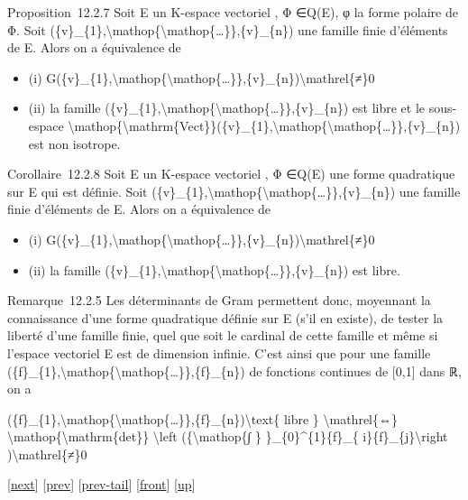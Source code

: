 \documentclass[]{article}
\begin{document}
Proposition~12.2.7 Soit E un K-espace vectoriel , Φ ∈Q(E), φ la forme
polaire de Φ. Soit
(\{v\}\_\{1\},\textbackslash{}mathop\{\textbackslash{}mathop\{\ldots{}\}\},\{v\}\_\{n\})
une famille finie d'éléments de E. Alors on a équivalence de

\begin{itemize}
\itemsep1pt\parskip0pt
\item
  (i)
  G(\{v\}\_\{1\},\textbackslash{}mathop\{\textbackslash{}mathop\{\ldots{}\}\},\{v\}\_\{n\})\textbackslash{}mathrel\{≠\}0
\item
  (ii) la famille
  (\{v\}\_\{1\},\textbackslash{}mathop\{\textbackslash{}mathop\{\ldots{}\}\},\{v\}\_\{n\})
  est libre et le sous-espace
  \textbackslash{}mathop\{\textbackslash{}mathrm\{Vect\}\}(\{v\}\_\{1\},\textbackslash{}mathop\{\textbackslash{}mathop\{\ldots{}\}\},\{v\}\_\{n\})
  est non isotrope.
\end{itemize}

Corollaire~12.2.8 Soit E un K-espace vectoriel , Φ ∈Q(E) une forme
quadratique sur E qui est définie. Soit
(\{v\}\_\{1\},\textbackslash{}mathop\{\textbackslash{}mathop\{\ldots{}\}\},\{v\}\_\{n\})
une famille finie d'éléments de E. Alors on a équivalence de

\begin{itemize}
\itemsep1pt\parskip0pt
\item
  (i)
  G(\{v\}\_\{1\},\textbackslash{}mathop\{\textbackslash{}mathop\{\ldots{}\}\},\{v\}\_\{n\})\textbackslash{}mathrel\{≠\}0
\item
  (ii) la famille
  (\{v\}\_\{1\},\textbackslash{}mathop\{\textbackslash{}mathop\{\ldots{}\}\},\{v\}\_\{n\})
  est libre.
\end{itemize}

Remarque~12.2.5 Les déterminants de Gram permettent donc, moyennant la
connaissance d'une forme quadratique définie sur E (s'il en existe), de
tester la liberté d'une famille finie, quel que soit le cardinal de
cette famille et même si l'espace vectoriel E est de dimension infinie.
C'est ainsi que pour une famille
(\{f\}\_\{1\},\textbackslash{}mathop\{\textbackslash{}mathop\{\ldots{}\}\},\{f\}\_\{n\})
de fonctions continues de {[}0,1{]} dans ℝ, on a

(\{f\}\_\{1\},\textbackslash{}mathop\{\textbackslash{}mathop\{\ldots{}\}\},\{f\}\_\{n\})\textbackslash{}text\{
libre \} \textbackslash{}mathrel\{⇔\}
\textbackslash{}mathop\{\textbackslash{}mathrm\{det\}\}
\textbackslash{}left (\{\textbackslash{}mathop\{∫ \}
\}\_\{0\}\^{}\{1\}\{f\}\_\{ i\}\{f\}\_\{j\}\textbackslash{}right
)\textbackslash{}mathrel\{≠\}0

{[}\href{coursse69.html}{next}{]} {[}\href{coursse67.html}{prev}{]}
{[}\href{coursse67.html\#tailcoursse67.html}{prev-tail}{]}
{[}\href{coursse68.html}{front}{]}
{[}\href{coursch13.html\#coursse68.html}{up}{]}
\end{document}
